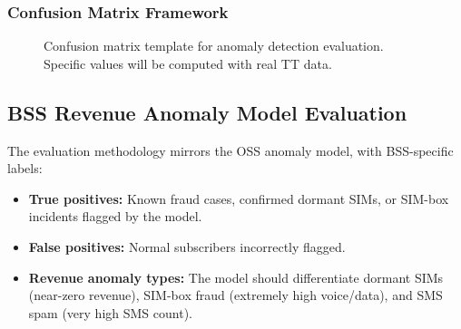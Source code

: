 \subsubsection{Confusion Matrix Framework}

\begin{figure}[H]
\centering
{}
\caption{Confusion matrix template for anomaly detection evaluation. Specific values will be computed with real TT data.}
\label{fig:confusion-matrix}
\end{figure}

\subsection{BSS Revenue Anomaly Model Evaluation}

The evaluation methodology mirrors the OSS anomaly model, with BSS-specific labels:
\begin{itemize}
  \item \textbf{True positives:} Known fraud cases, confirmed dormant SIMs, or SIM-box incidents flagged by the model.
  \item \textbf{False positives:} Normal subscribers incorrectly flagged.
  \item \textbf{Revenue anomaly types:} The model should differentiate dormant SIMs (near-zero revenue), SIM-box fraud (extremely high voice/data), and SMS spam (very high SMS count).
\end{itemize}

